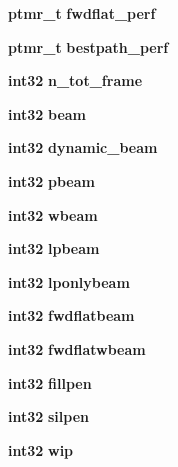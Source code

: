 \begin{DoxyCompactItemize}
\item 
{\bf ptmr\-\_\-t} {\bfseries fwdflat\-\_\-perf}\label{structngram__search__s_a9af672c28dfc39bdfa5dd8e7e9e54989}

\item 
{\bf ptmr\-\_\-t} {\bfseries bestpath\-\_\-perf}\label{structngram__search__s_a67d755fd060de20d50c1a2d237618917}

\item 
{\bf int32} {\bfseries n\-\_\-tot\-\_\-frame}\label{structngram__search__s_a45baee2d3862a81cc21946a9602317be}

\item 
{\bf int32} {\bfseries beam}\label{structngram__search__s_a7f93fc812f623bcad2d1d8d14724ab52}

\item 
{\bf int32} {\bfseries dynamic\-\_\-beam}\label{structngram__search__s_ae6ad22c96dc7d709f529dfaa355a47a2}

\item 
{\bf int32} {\bfseries pbeam}\label{structngram__search__s_a096243fad532d780754e64ffb0a52d9c}

\item 
{\bf int32} {\bfseries wbeam}\label{structngram__search__s_a443510527cfba0cb4010a0deb09480c2}

\item 
{\bf int32} {\bfseries lpbeam}\label{structngram__search__s_ab708267dd98bbc156038b8b99b716ee7}

\item 
{\bf int32} {\bfseries lponlybeam}\label{structngram__search__s_ab51f51a73bbce696f9ac912131db0753}

\item 
{\bf int32} {\bfseries fwdflatbeam}\label{structngram__search__s_a251365027c09b72a43a9be9a161100b0}

\item 
{\bf int32} {\bfseries fwdflatwbeam}\label{structngram__search__s_a6178f10c6de4f77ac6a660ad31fbbd77}

\item 
{\bf int32} {\bfseries fillpen}\label{structngram__search__s_a2b791bfa3cc372e30d844a687ceea3d2}

\item 
{\bf int32} {\bfseries silpen}\label{structngram__search__s_ab2cbba86475a85836abf87faee4745dc}

\item 
{\bf int32} {\bfseries wip}\label{structngram__search__s_a1e198579ab46c7de67d8b3eb1e1bf2ec}


\end{DoxyCompactItemize}
